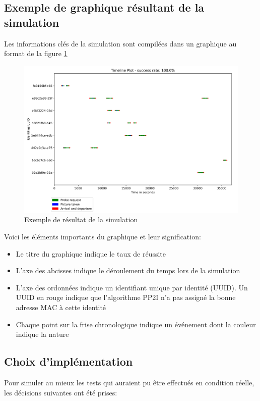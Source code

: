 \subsection{Exemple de graphique résultant de la simulation}
Les informations clés de la simulation sont compilées dans un graphique au format de la figure \ref{fig:simulation-result-example} 
\begin{figure}[H]
	\centering
	\includegraphics[width=12cm]{images/tests/exemple-graph.png}
	\caption{Exemple de résultat de la simulation}
	\label{fig:simulation-result-example}
\end{figure}

Voici les éléments importants du graphique et leur signification:
\begin{itemize}
    \item Le titre du graphique indique le taux de réussite
    \item L'axe des abcisses indique le déroulement du temps lors de la simulation
    \item L'axe des ordonnées indique un identifiant unique par identité (UUID). Un UUID en rouge indique que l'algorithme PP2I n'a pas assigné la bonne adresse MAC à cette identité 
    \item Chaque point sur la frise chronologique indique un événement dont la couleur indique la nature
\end{itemize}

\subsection{Choix d'implémentation}
Pour simuler au mieux les tests qui auraient pu être effectués en condition réelle, les décisions suivantes ont été prises:

